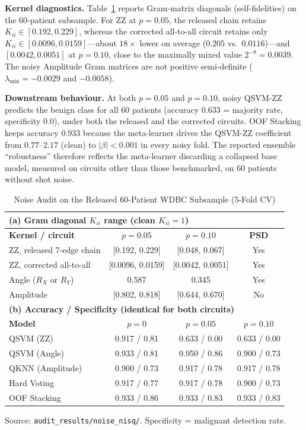 \documentclass[journal,twocolumn]{IEEEtran}
\begin{document}
\textbf{Kernel diagnostics.} Table~\ref{tab:noise} reports Gram-matrix diagonals (self-fidelities) on the 60-patient subsample. For ZZ at $p=0.05$, the released chain retains $K_{ii}\in[0.192, 0.229]$, whereas the corrected all-to-all circuit retains only $K_{ii}\in[0.0096, 0.0159]$---about $18\times$ lower on average ($0.205$ vs.\ $0.0116$)---and $[0.0042, 0.0051]$ at $p=0.10$, close to the maximally mixed value $2^{-8}=0.0039$. The noisy Amplitude Gram matrices are not positive semi-definite ($\lambda_{\min}=-0.0029$ and $-0.0058$).

\textbf{Downstream behaviour.} At both $p=0.05$ and $p=0.10$, noisy QSVM-ZZ predicts the benign class for all 60 patients (accuracy $0.633$ = majority rate, specificity $0.0$), under both the released and the corrected circuits. OOF Stacking keeps accuracy $0.933$ because the meta-learner drives the QSVM-ZZ coefficient from $0.77$--$2.17$ (clean) to $|\beta|<0.001$ in every noisy fold. The reported ensemble ``robustness'' therefore reflects the meta-learner discarding a collapsed base model, measured on circuits other than those benchmarked, on 60 patients without shot noise.

\begin{table}[!t]
\caption{Noise Audit on the Released 60-Patient WDBC Subsample (5-Fold CV)}
\label{tab:noise}
\centering
\scriptsize
\setlength{\tabcolsep}{2pt}
\renewcommand{\arraystretch}{1.12}
\begin{tabular}{lccc}
\toprule
\multicolumn{4}{l}{\textbf{(a) Gram diagonal $K_{ii}$ range (clean $K_{ii}=1$)}} \\
\midrule
\textbf{Kernel / circuit} & $p=0.05$ & $p=0.10$ & \textbf{PSD} \\
\midrule
ZZ, released 7-edge chain   & [0.192, 0.229] & [0.048, 0.067] & Yes \\
ZZ, corrected all-to-all    & [0.0096, 0.0159] & [0.0042, 0.0051] & Yes \\
Angle ($R_X$ or $R_Y$)      & 0.587 & 0.345 & Yes \\
Amplitude                   & [0.802, 0.818] & [0.644, 0.670] & No \\
\midrule
\multicolumn{4}{l}{\textbf{(b) Accuracy / Specificity (identical for both circuits)}} \\
\midrule
\textbf{Model} & $p=0$ & $p=0.05$ & $p=0.10$ \\
\midrule
QSVM (ZZ)        & 0.917 / 0.81 & 0.633 / 0.00 & 0.633 / 0.00 \\
QSVM (Angle)     & 0.933 / 0.81 & 0.950 / 0.86 & 0.900 / 0.73 \\
QKNN (Amplitude) & 0.900 / 0.73 & 0.917 / 0.78 & 0.917 / 0.78 \\
Hard Voting      & 0.917 / 0.77 & 0.917 / 0.78 & 0.900 / 0.73 \\
OOF Stacking     & 0.933 / 0.86 & 0.933 / 0.83 & 0.933 / 0.83 \\
\bottomrule
\end{tabular}

\vspace{2pt}
{\tiny Source: \texttt{audit\_results/noise\_nisq/}. Specificity = malignant detection rate.\par}
\end{table}
\end{document}
